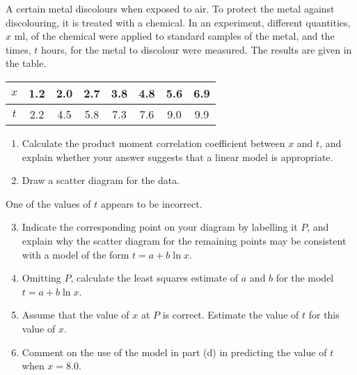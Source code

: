 \begin{problem}
    A certain metal discolours when exposed to air. To protect the metal against discolouring, it is treated with a chemical. In an experiment, different quantities, $x$ ml, of the chemical were applied to standard samples of the metal, and the times, $t$ hours, for the metal to discolour were measured. The results are given in the table.

    \begin{table}[H]
        \centering
        \begin{tabular}{|c|c|c|c|c|c|c|c|} \hline
            $x$ & 1.2 & 2.0 & 2.7 & 3.8 & 4.8 & 5.6 & 6.9 \\ \hline
            $t$ & 2.2 & 4.5 & 5.8 & 7.3 & 7.6 & 9.0 & 9.9 \\ \hline
        \end{tabular}
    \end{table}

    \begin{enumerate}
        \item Calculate the product moment correlation coefficient between $x$ and $t$, and explain whether your answer suggests that a linear model is appropriate.
        \item Draw a scatter diagram for the data.
    \end{enumerate}

    One of the values of $t$ appears to be incorrect.

    \begin{enumerate}
        \setcounter{enumi}{2}
        \item Indicate the corresponding point on your diagram by labelling it $P$, and explain why the scatter diagram for the remaining points may be consistent with a model of the form $t=a+b\ln x$.
        \item Omitting $P$, calculate the least squares estimate of $a$ and $b$ for the model $t=a+b\ln x$.
        \item Assume that the value of $x$ at $P$ is correct. Estimate the value of $t$ for this value of $x$.
        \item Comment on the use of the model in part (d) in predicting the value of $t$ when $x=8.0$.
    \end{enumerate}
\end{problem}
